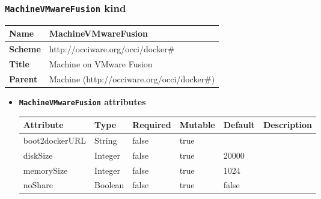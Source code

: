 \subsubsection{\texttt{MachineVMwareFusion} kind}
\begin{center}
\begin{tabular}{|l|l|}
  \hline
  \textbf{Name} & MachineVMwareFusion \\
  \hline  
  \textbf{Scheme} & http://occiware.org/occi/docker\# \\
  \hline
  \textbf{Title} & Machine on VMware Fusion \\
  \hline
  \textbf{Parent} & Machine (http://occiware.org/occi/docker\#) \\
  \hline
\end{tabular}
\end{center}
\begin{itemize}
\item \textbf{\texttt{MachineVMwareFusion} attributes}

\begin{tabularx}{\textwidth}{|l|l|p{1.4cm}|p{1.3cm}|l|X|}
  \hline
  \textbf{Attribute} & \textbf{Type} & \textbf{Required} & \textbf{Mutable} & \textbf{Default} & \textbf{Description} \\
  \hline  
  boot2dockerURL & String & false & true &  &  \\
  \hline
  diskSize & Integer & false & true & 20000 &  \\
  \hline
  memorySize & Integer & false & true & 1024 &  \\
  \hline
  noShare & Boolean & false & true & false &  \\
  \hline
\end{tabularx}
\end{itemize}



